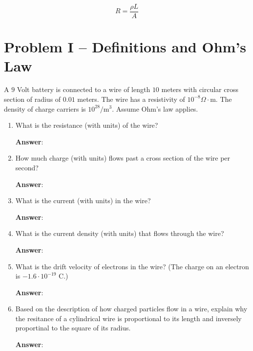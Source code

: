 \documentclass{article}
\begin{document}
$$R = \frac{\rho L}{A}$$

\newpage

\section{Problem I -- Definitions and Ohm's Law}

A $9$ Volt battery is connected to a wire of length $10$ meters with circular cross section of radius of $0.01$ meters. The wire has a resistivity of $10^{-8}\Omega\cdot\text{m}$. The density of charge carriers is $10^{28}/\text{m}^3$. Assume Ohm's law applies.

\begin{enumerate}

  \item What is the resistance (with units) of the wire?

        \ifsolutions
        \textbf{Answer}:
        \else
        \vskip 84pt
        \fi

  \item How much charge (with units) flows past a cross section of the wire per second?

        \ifsolutions
        \textbf{Answer}:
        \else
        \vskip 84pt
        \fi

  \item What is the current (with units) in the wire?

        \ifsolutions
        \textbf{Answer}:
        \else
        \vskip 84pt
        \fi

  \item What is the current density (with units) that flows through the wire?

        \ifsolutions
        \textbf{Answer}:
        \else
        \vskip 84pt
        \fi

  \item What is the drift velocity of electrons in the wire? (The charge on an electron is $-1.6·10^{-19}\text{ C}$.)

        \ifsolutions
        \textbf{Answer}:
        \else
        \vskip 84pt
        \fi

  \item Based on the description of how charged particles flow in a wire, explain why the resitance of a cylindrical wire is proportional to its length and inversely proportinal to the square of its radius.

        \ifsolutions
        \textbf{Answer}:
        \else

        \fi

\end{enumerate}
\end{document}
